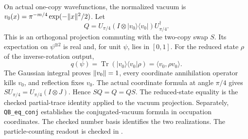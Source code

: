 \begin{lemma}\label{lem:coherent-projection}
  \leanok
  \par
  On actual one-copy wavefunctions, the normalized vacuum is
  $v_0(x)=\pi^{-m/4}\exp(-\lVert x \rVert^2/2)$. Let
  \[
    Q=U_{\pi/4}(I\otimes|v_0\rangle\langle v_0|)U_{\pi/4}^\dagger.
  \]
  This is an orthogonal projection commuting with the two-copy swap $S$.
  Its expectation on $\psi^{\otimes2}$ is real and, for unit $\psi$, lies
  in $[0,1]$. For the reduced state $\rho$ of the inverse-rotation output,
  \[
    q(\psi)=\operatorname{Tr}(|v_0\rangle\langle v_0|\rho)=\langle v_0,\rho v_0\rangle.
  \]
  The Gaussian integral proves $\lVert v_0 \rVert=1$, every coordinate annihilation
  operator kills $v_0$, and reflection fixes $v_0$.
  The actual coordinate formula at angle $\pi/4$ gives
  $S U_{\pi/4}=U_{\pi/4}(I\otimes J)$. Hence $SQ=Q=QS$.
  The reduced-state equality is the checked partial-trace identity applied
  to the vacuum projection. Separately, \texttt{QB\_eq\_conj} establishes
  the conjugated-vacuum formula in occupation coordinates. The checked number
  basis identifies the two realizations. The particle-counting readout is
  checked in .
\end{lemma}

